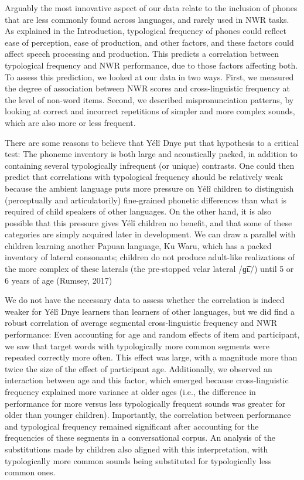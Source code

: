 \documentclass[
  american,
  ,man,floatsintext]{apa6}
\begin{document}
Arguably the most innovative aspect of our data relate to the inclusion of phones that are less commonly found across languages, and rarely used in NWR tasks. As explained in the Introduction, typological frequency of phones could reflect ease of perception, ease of production, and other factors, and these factors could affect speech processing and production. This predicts a correlation between typological frequency and NWR performance, due to those factors affecting both. To assess this prediction, we looked at our data in two ways. First, we measured the degree of association between NWR scores and cross-linguistic frequency at the level of non-word items. Second, we described mispronunciation patterns, by looking at correct and incorrect repetitions of simpler and more complex sounds, which are also more or less frequent.

There are some reasons to believe that Yélî Dnye put that hypothesis to a critical test: The phoneme inventory is both large and acoustically packed, in addition to containing several typologically infrequent (or unique) contrasts. One could then predict that correlations with typological frequency should be relatively weak because the ambient language puts more pressure on Yélî children to distinguish (perceptually and articulatorily) fine-grained phonetic differences than what is required of child speakers of other languages. On the other hand, it is also possible that this pressure gives Yélî children no benefit, and that some of these categories are simply acquired later in development. We can draw a parallel with children learning another Papuan language, Ku Waru, which has a packed inventory of lateral consonants; children do not produce adult-like realizations of the more complex of these laterals (the pre-stopped velar lateral /ɡ͡ʟ/) until 5 or 6 years of age (Rumsey, 2017)

We do not have the necessary data to assess whether the correlation is indeed weaker for Yélî Dnye learners than learners of other languages, but we did find a robust correlation of average segmental cross-linguistic frequency and NWR performance: Even accounting for age and random effects of item and participant, we saw that target words with typologically more common segments were repeated correctly more often. This effect was large, with a magnitude more than twice the size of the effect of participant age. Additionally, we observed an interaction between age and this factor, which emerged because cross-linguistic frequency explained more variance at older ages (i.e., the difference in performance for more versus less typologically frequent sounds was greater for older than younger children). Importantly, the correlation between performance and typological frequency remained significant after accounting for the frequencies of these segments in a conversational corpus. An analysis of the substitutions made by children also aligned with this interpretation, with typologically more common sounds being substituted for typologically less common ones.
\end{document}
